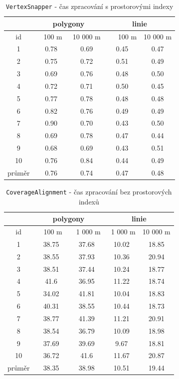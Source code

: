 \begin{table}[H]
 \centering
  \small
   \caption{\texttt{Vertex\-Snapper} -
	    čas zpracování s prostorovými indexy}
  \begin{tabular}{|c|c|c|c|c|}
   \hline
      & \multicolumn{2}{c|}{polygony} & 
 	\multicolumn{2}{c|}{linie} \\
   \hline
    id  &  ~~100 m~ & 10 000 m & ~~~100 m & 10 000 m\\
   \hline
   \hline
   1  & 0.78 & 0.69 &  0.45 & 0.47 \\
   2  & 0.75 & 0.72 &  0.51 & 0.49 \\
   3  & 0.69 & 0.76 &  0.48 & 0.50 \\
   4  & 0.72 & 0.71 &  0.50 & 0.45 \\
   5  & 0.77 & 0.78 &  0.48 & 0.48 \\
   6  & 0.82 & 0.76 &  0.49 & 0.49 \\
   7  & 0.90 & 0.70 &  0.43 & 0.50 \\
   8  & 0.69 & 0.78 &  0.47 & 0.44 \\
   9  & 0.68 & 0.69 &  0.43 & 0.51 \\
   10 & 0.76 & 0.84 &  0.44 & 0.49 \\
   \hline
   \hline
   průměr & 0.76 & 0.74 & 0.47 & 0.48 \\
   \hline
  \end{tabular}
   \label{tab:vs-s}
\end{table}
 
\begin{table}[H]
 \centering
  \small
   \caption{\texttt{Coverage\-Alignment} - 
	    čas zpracování bez prostorových indexů}
  \begin{tabular}{|c|c|c|c|c|}
   \hline
      & \multicolumn{2}{c|}{polygony} & 
 	\multicolumn{2}{c|}{linie} \\
   \hline
    id  &  ~~100 m~ & ~1 000 m & ~1 000 m & 10 000 m\\
   \hline
   \hline
1	&	38.75	&	37.68	&	10.02	&	18.85	\\
2	&	38.55	&	37.93	&	10.36	&	20.94	\\
3	&	38.51	&	37.44	&	10.24	&	18.77	\\
4	&	41.6	&	36.95	&	11.22	&	18.74	\\
5	&	34.02	&	41.81	&	10.04	&	18.83	\\
6	&	40.31	&	38.55	&	10.44	&	18.73	\\
7	&	38.77	&	41.39	&	11.21	&	20.91	\\
8	&	38.54	&	36.79	&	10.09	&	18.98	\\
9	&	37.69	&	39.69	&	9.67	&	18.81	\\
10	&	36.72	&	41.6	&	11.67	&	20.87	\\
   \hline
   \hline
   průměr & 38.35 & 38.98 & 10.51 & 19.44 \\
   \hline
  \end{tabular}
   \label{tab:ca-bez}
\end{table}
 
